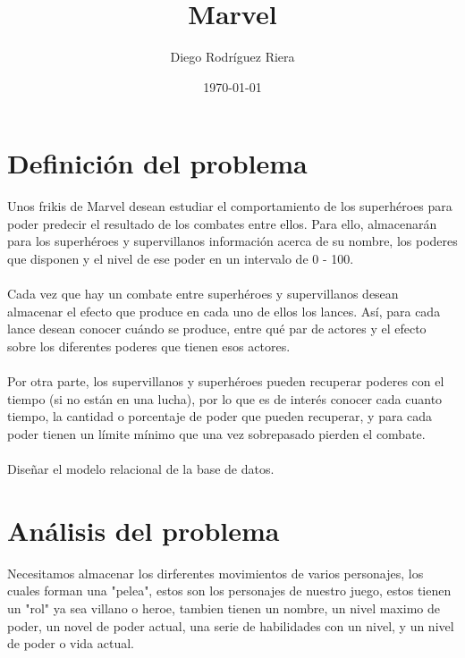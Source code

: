 \documentclass[a4paper,10pt]{article}
\title{Marvel}
\author{Diego Rodríguez Riera}
\date{\today}
\begin{document}
\maketitle
\pagebreak
\tableofcontents
\pagebreak

\section{Definición del problema}
Unos  frikis  de  Marvel  desean  estudiar  el  comportamiento  de  los  superhéroes  para  poder  predecir  el  resultado  de  los  combates  entre  ellos.  Para  ello,  almacenarán  para  los  superhéroes  y  supervillanos información acerca de su nombre, los poderes que disponen y el nivel de ese poder en  un intervalo de 0 - 100.
\paragraph{}
Cada vez que hay un combate entre superhéroes y supervillanos desean almacenar el efecto  que  produce  en  cada  uno  de  ellos  los  lances. Así,  para  cada  lance  desean  conocer  cuándo  se  produce, entre qué par de actores y el efecto sobre los diferentes poderes que tienen esos actores.
\paragraph{}
Por  otra  parte,  los  supervillanos  y  superhéroes  pueden  recuperar  poderes  con  el  tiempo  (si  no  están  en  una  lucha),  por  lo  que  es  de  interés  conocer  cada  cuanto  tiempo,  la  cantidad  o  porcentaje de poder que pueden recuperar, y para cada poder tienen un límite mínimo que una vez  sobrepasado pierden el combate.
\paragraph{}

Diseñar el modelo relacional  de la base  de datos.

\section{Análisis del problema}

Necesitamos almacenar los dirferentes movimientos de varios personajes, los cuales forman una "pelea", estos son los personajes de nuestro juego, estos tienen un "rol" ya sea villano o heroe, tambien tienen un nombre, un nivel maximo de poder, un novel de poder actual, una serie de habilidades con un nivel, y un nivel de poder o vida actual.
\end{document}
